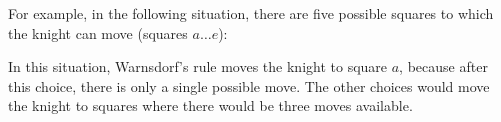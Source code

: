 For example, in the following situation, there are five
possible squares to which the knight can move (squares $a \ldots e$):
\begin{center}
\end{center}
In this situation, Warnsdorf's rule moves the knight to square $a$,
because after this choice, there is only a single possible move.
The other choices would move the knight to squares where
there would be three moves available.
